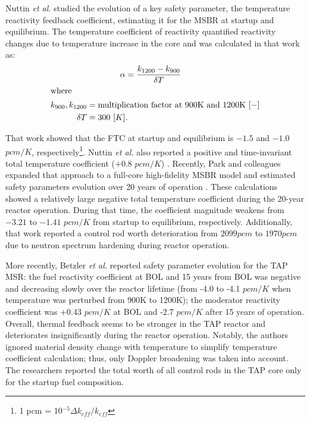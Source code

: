 Nuttin \emph{et al.} studied the evolution of a key safety parameter, the 
temperature reactivity feedback coefficient, estimating it for the \gls{MSBR} 
at startup and equilibrium. The temperature coefficient of reactivity 
quantified reactivity changes due to temperature increase in the core and was 
calculated in that work as:
\begin{align}\label{eq:feedback}
	&\qquad\qquad \alpha = \frac{k_{1200} - k_{900}}{\delta 
	T} \\
	\intertext{where}
	k_{900}, k_{1200}  &= \mbox{multiplication factor at 900K and 
		1200K $[-]$} \nonumber \\
	\delta T &= \mbox{300 $[K]$.}\nonumber
\end{align}

That work showed that the \gls{FTC} at startup and equilibrium is $-1.5$ 
and $-1.0$ $pcm/K$, respectively\footnote{ 1 pcm = 10$^{-5}\Delta 
k_{eff}/k_{eff}$}. Nuttin \emph{et al.} also reported a positive and 
time-invariant total temperature coefficient ($+0.8$ $pcm/K$) 
\cite{nuttin_potential_2005}. Recently, Park and colleagues expanded that 
approach to a full-core high-fidelity \gls{MSBR} model and estimated safety 
parameters evolution over 20 years of operation \cite{park_whole_2015}. These 
calculations showed a relatively large negative total temperature coefficient 
during the 20-year reactor operation. During that time, the coefficient 
magnitude weakens from $-3.21$ to $-1.41$ $pcm/K$ from startup to equilibrium, 
respectively. Additionally, that work reported a control rod worth 
deterioration from $2099pcm$ to $1970pcm$ due to neutron spectrum hardening 
during reactor operation. 

More recently, Betzler \emph{et al.} \cite{betzler_assessment_2017-1} reported 
safety parameter evolution for the \gls{TAP} \gls{MSR}: the fuel 
reactivity coefficient at \gls{BOL} and 15 years from \gls{BOL} was negative 
and decreasing slowly over the reactor lifetime (from -4.0 to -4.1 $pcm/K$ 
when temperature was perturbed from 900K to 1200K); the moderator reactivity 
coefficient was +0.43 $pcm/K$ at \gls{BOL} and -2.7 $pcm/K$ after 15 
years of operation. Overall, thermal feedback seems to be stronger in the 
\gls{TAP} reactor and deteriorates insignificantly during the reactor 
operation. Notably, the authors ignored material density change with 
temperature to simplify temperature coefficient calculation; thus, only  
Doppler broadening was taken into account. The researchers reported the total 
worth of all control rods in the \gls{TAP} core only for the startup fuel 
composition. 

